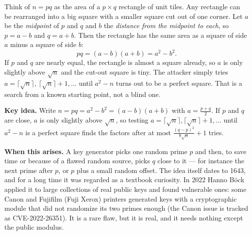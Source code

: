 \documentclass[11pt]{article}
\theoremstyle{definition}
\theoremstyle{remark}
\begin{document}
\begin{intuition}
Think of $n=pq$ as the area of a $p\times q$ rectangle of unit tiles. Any rectangle can be rearranged into a big square with a smaller square cut out of one corner. Let $a$ be the \emph{midpoint} of $p$ and $q$ and $b$ the \emph{distance from the midpoint to each}, so $p=a-b$ and $q=a+b$. Then the rectangle has the same area as a square of side $a$ minus a square of side $b$:
\[ pq=(a-b)(a+b)=a^2-b^2. \]
If $p$ and $q$ are nearly equal, the rectangle is almost a square already, so $a$ is only slightly above $\sqrt n$ and the cut-out square is tiny. The attacker simply tries $a=\lceil\sqrt n\rceil,\ \lceil\sqrt n\rceil+1,\dots$ until $a^2-n$ turns out to be a perfect square. That is a search from a known starting point, not a blind one.
\end{intuition}

\textbf{Key idea.} Write $n=pq=a^2-b^2=(a-b)(a+b)$ with $a=\tfrac{p+q}{2}$. If $p$ and $q$ are close, $a$ is only slightly above $\sqrt n$, so testing $a=\lceil\sqrt n\rceil,\lceil\sqrt n\rceil+1,\dots$ until $a^2-n$ is a perfect square finds the factors after at most $\tfrac{(q-p)^2}{8\sqrt n}+1$ tries.

\textbf{When this arises.} A key generator picks one random prime $p$ and then, to save time or because of a flawed random source, picks $q$ close to it --- for instance the next prime after $p$, or $p$ plus a small random offset. The idea itself dates to 1643, and for a long time it was regarded as a textbook curiosity. In 2022 Hanno Böck applied it to large collections of real public keys and found vulnerable ones: some Canon and Fujifilm (Fuji Xerox) printers generated keys with a cryptographic module that did not randomize its two primes enough (the Canon issue is tracked as CVE-2022-26351). It is a rare flaw, but it is real, and it needs nothing except the public modulus.
\end{document}
